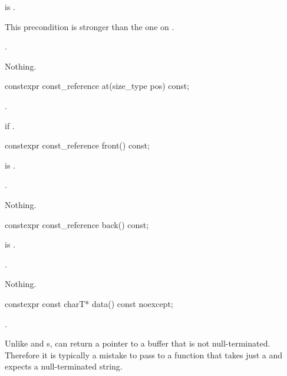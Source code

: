 \begin{itemdescr}
\pnum
\hardexpects
{} is .
\begin{note}
This precondition is stronger than the one on .
\end{note}

\pnum
\returns
{}.

\pnum
\throws
Nothing.
\end{itemdescr}

%
\begin{itemdecl}
constexpr const_reference at(size_type pos) const;
\end{itemdecl}

\begin{itemdescr}
\pnum
\returns
{}.

\pnum
\throws
{} if .
\end{itemdescr}

%
\begin{itemdecl}
constexpr const_reference front() const;
\end{itemdecl}

\begin{itemdescr}
\pnum
\hardexpects
{} is .

\pnum
\returns
{}.

\pnum
\throws
Nothing.
\end{itemdescr}

%
\begin{itemdecl}
constexpr const_reference back() const;
\end{itemdecl}

\begin{itemdescr}
\pnum
\hardexpects
{} is .

\pnum
\returns
{}.

\pnum
\throws
Nothing.
\end{itemdescr}

%
\begin{itemdecl}
constexpr const charT* data() const noexcept;
\end{itemdecl}

\begin{itemdescr}
\pnum
\returns
{}.

\pnum
\begin{note}
Unlike  and s,
 can return a pointer to a buffer that is not null-terminated.
Therefore it is typically a mistake to pass  to a function
that takes just a  and expects a null-terminated string.
\end{note}
\end{itemdescr}

